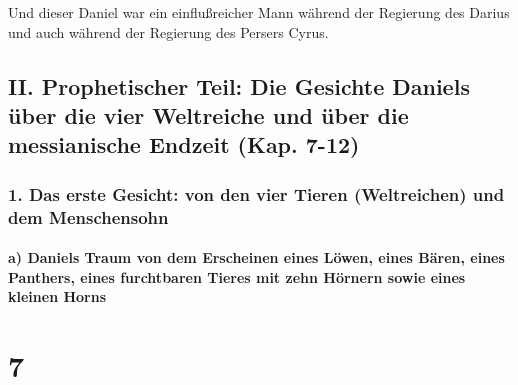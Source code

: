 Und dieser Daniel war ein einflußreicher Mann während der
Regierung des Darius und auch während der Regierung des Persers Cyrus.

\hypertarget{ii.-prophetischer-teil-die-gesichte-daniels-uxfcber-die-vier-weltreiche-und-uxfcber-die-messianische-endzeit-kap.-7-12}{%
\subsection{II. Prophetischer Teil: Die Gesichte Daniels über die vier
Weltreiche und über die messianische Endzeit (Kap.
7-12)}\label{ii.-prophetischer-teil-die-gesichte-daniels-uxfcber-die-vier-weltreiche-und-uxfcber-die-messianische-endzeit-kap.-7-12}}

\hypertarget{das-erste-gesicht-von-den-vier-tieren-weltreichen-und-dem-menschensohn}{%
\subsubsection{1. Das erste Gesicht: von den vier Tieren (Weltreichen)
und dem
Menschensohn}\label{das-erste-gesicht-von-den-vier-tieren-weltreichen-und-dem-menschensohn}}

\hypertarget{a-daniels-traum-von-dem-erscheinen-eines-luxf6wen-eines-buxe4ren-eines-panthers-eines-furchtbaren-tieres-mit-zehn-huxf6rnern-sowie-eines-kleinen-horns}{%
\paragraph{a) Daniels Traum von dem Erscheinen eines Löwen, eines Bären,
eines Panthers, eines furchtbaren Tieres mit zehn Hörnern sowie eines
kleinen
Horns}\label{a-daniels-traum-von-dem-erscheinen-eines-luxf6wen-eines-buxe4ren-eines-panthers-eines-furchtbaren-tieres-mit-zehn-huxf6rnern-sowie-eines-kleinen-horns}}

\hypertarget{section-6}{%
\section{7}\label{section-6}}

